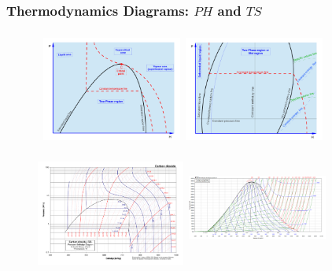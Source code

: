 \documentclass[10pt,compress]{beamer}
\begin{document}
\begin{frame}
 \frametitle{Thermodynamics Diagrams: $PH$ and $TS$}
   \begin{figure}%
     \vbox{
      \hbox{\hspace{.8cm}
      \includegraphics[width=4.6cm,height=3.8cm,clip]{./Pics/Overview_Refrig18}
      \hspace{.1cm}
      \includegraphics[width=4.6cm,height=3.8cm,clip]{./Pics/Overview_Refrig17}}
      \vspace{-.1cm}
      \hbox{\hspace{.8cm}
      \includegraphics[width=4.9cm,height=4.cm,clip]{./Pics/CO2col}
      \hspace{.1cm}
      \includegraphics[width=4.6cm,height=3.87cm,clip]{./Pics/water_TS.png}}}
   \end{figure}
\end{frame}


\end{document}
